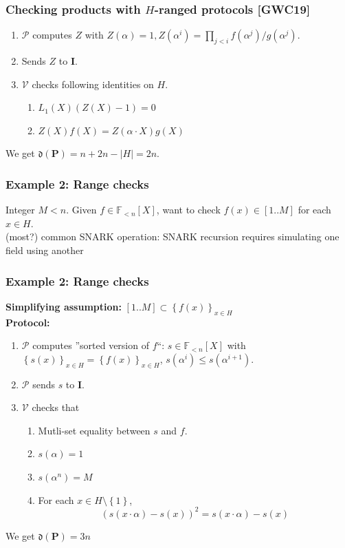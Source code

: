 \documentclass[shadesubsections,compress,14pt,mathserif]{beamer}
\newcommand{\prot}{\mathbf{P}}
\newcommand{\aggdeg}[1]{\mathfrak{d}(#1)}
\newcommand{\F}{\ensuremath{\mathbb F}}
\newcommand{\set}[1]{\ensuremath{\left\{#1\right\}}}
\newcommand{\sett}[2]{\ensuremath{\left\{#1\right\}_{#2}}}
\newcommand{\ver}{\ensuremath{\mathcal{V}}}
\newcommand{\prv}{\ensuremath{\mathcal{P}}}
\newcommand{\polysofdeg}[1]{\F_{< #1}[X]}
\newcommand{\ideal}{\mathbf{I}}
\newcommand{\gen}{\alpha}
\begin{document}
\begin{frame}
\frametitle{Checking products with $H$-ranged protocols \small{[GWC19]}}   %
 \begin{enumerate}
  \item $\prv$ computes $Z$ with 
  $ Z(\gen)=1, Z(\gen^i) = \prod_{j<i}  f(\gen^j)/g(\gen^j)$.
  \item Sends $Z$ to $\ideal$.   \pause
  \item $\ver$ checks following identities on $H$.
  \begin{enumerate}
   \item $L_1(X) (Z(X)-1) =0$
   \item $Z(X) f(X) = Z(\gen\cdot X)g(X)$\pause
 \end{enumerate}

 \end{enumerate}
 \vspace{0.2in}
We get $\aggdeg{\prot}=n+2n -|H| = 2n$.


\end{frame}
\begin{frame}
\frametitle{Example 2: Range checks}
Integer $M<n$. Given $f\in \polysofdeg{n}$, want to check $f(x)\in [1..M]$ for each $x\in H$.\\ \pause
(most?) common SNARK operation: SNARK recursion requires simulating one field using another \\ 

\end{frame}
\begin{frame}
\frametitle{Example 2: Range checks}

\textbf{Simplifying assumption:} $[1..M]\subset \sett{f(x)}{x\in H}$\\ \pause
\textbf{Protocol:}
 \begin{enumerate}
 \item $\prv$ computes ''sorted version of $f$``: $s\in \polysofdeg{n}$ with
 $\sett{s(x)}{x\in H}=\sett{f(x)}{x\in H}$, $s(\alpha^i)\leq s(\alpha^{i+1})$.\pause
 \item $\prv$ sends $s$ to $\ideal$.\pause
 \item $\ver$ checks that
 \begin{enumerate}
  \item Mutli-set equality between $s$ and $f$.\pause
  \item $s(\alpha)=1$
  \item $s(\alpha^n) = M$\pause
  \item For each $x\in H\setminus \set{1}$,\pause
  \[ (s(x\cdot \alpha) - s(x))^2 = s(x\cdot \alpha) - s(x)\]
 \end{enumerate}

\end{enumerate}


We get $\aggdeg{\prot}=3n$ \\
\end{frame}
\end{document}
